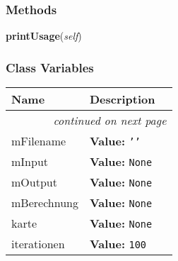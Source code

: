     \label{Main:Main}


  \subsubsection{Methods}

    \label{Main:Main:printUsage}

    \vspace{0.5ex}

\hspace{.8\funcindent}\begin{boxedminipage}{\funcwidth}

    \raggedright \textbf{printUsage}(\textit{self})

\setlength{\parskip}{2ex}
\setlength{\parskip}{1ex}
    \end{boxedminipage}



  \subsubsection{Class Variables}

    \vspace{-1cm}
\hspace{\varindent}\begin{longtable}{|p{\varnamewidth}|p{\vardescrwidth}|l}
\cline{1-2}
\cline{1-2} \centering \textbf{Name} & \centering \textbf{Description}& \\
\cline{1-2}
\endhead\cline{1-2}\multicolumn{3}{r}{\small\textit{continued on next page}}\\\endfoot\cline{1-2}
\endlastfoot\raggedright m\-F\-i\-l\-e\-n\-a\-m\-e\- & \raggedright \textbf{Value:} 
{\tt \texttt{'}\texttt{}\texttt{'}}&\\
\cline{1-2}
\raggedright m\-I\-n\-p\-u\-t\- & \raggedright \textbf{Value:} 
{\tt None}&\\
\cline{1-2}
\raggedright m\-O\-u\-t\-p\-u\-t\- & \raggedright \textbf{Value:} 
{\tt None}&\\
\cline{1-2}
\raggedright m\-B\-e\-r\-e\-c\-h\-n\-u\-n\-g\- & \raggedright \textbf{Value:} 
{\tt None}&\\
\cline{1-2}
\raggedright k\-a\-r\-t\-e\- & \raggedright \textbf{Value:} 
{\tt None}&\\
\cline{1-2}
\raggedright i\-t\-e\-r\-a\-t\-i\-o\-n\-e\-n\- & \raggedright \textbf{Value:} 
{\tt 100}&\\
\cline{1-2}
\end{longtable}

